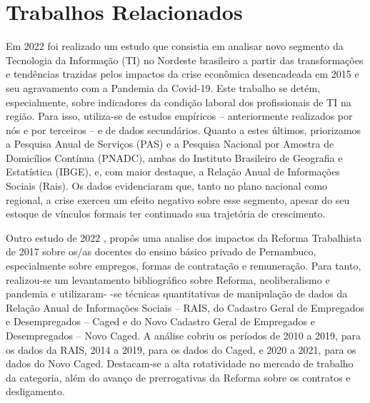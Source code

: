 \section{Trabalhos Relacionados}

Em 2022 foi realizado um estudo \cite{oliveira2022profissionais} que consistia em analisar novo segmento da Tecnologia da Informação (TI) no Nordeste brasileiro a partir das transformações e tendências trazidas pelos impactos da crise econômica desencadeada em 2015 e seu agravamento com a Pandemia da Covid-19. Este trabalho se detém, especialmente, sobre indicadores da condição laboral dos profissionais de TI na região. Para isso, utiliza-se de estudos empíricos – anteriormente realizados por nós e por terceiros – e de dados secundários. Quanto a estes últimos, priorizamos a Pesquisa Anual de Serviços (PAS) e a Pesquisa Nacional por Amostra de Domicílios Contínua (PNADC), ambas do Instituto Brasileiro de Geografia e Estatística (IBGE), e, com maior destaque, a Relação Anual de Informações Sociais (Rais). Os dados evidenciaram que, tanto no plano nacional como regional, a crise exerceu um efeito negativo sobre esse segmento, apesar do seu estoque de vínculos formais ter continuado sua trajetória de crescimento.

Outro estudo de 2022 \cite{cavalcanti2022reforma}, propôs uma analise dos impactos da Reforma Trabalhista de 2017 sobre os/as docentes do ensino básico privado de Pernambuco, especialmente sobre empregos, formas de contratação e remuneração. Para tanto, realizou-se um levantamento bibliográfico sobre Reforma, neoliberalismo e pandemia e utilizaram- -se técnicas quantitativas de manipulação de dados da Relação Anual de Informações Sociais – RAIS, do Cadastro Geral de Empregados e Desempregados – Caged e do Novo Cadastro Geral de Empregados e Desempregados – Novo Caged. A análise cobriu os períodos de 2010 a 2019, para os dados da RAIS, 2014 a 2019, para os dados do Caged, e 2020 a 2021, para os dados do Novo Caged. Destacam-se a alta rotatividade no mercado de trabalho da categoria, além do avanço de prerrogativas da Reforma sobre os contratos e desligamento.
  